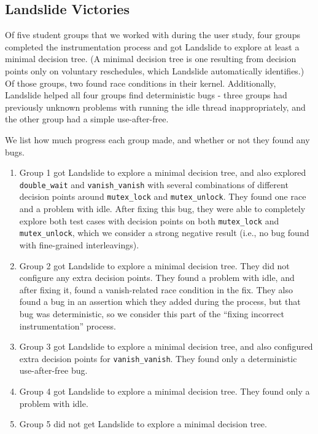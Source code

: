 \subsection{Landslide Victories}
\label{sec:eval-victory}

Of five student groups that we worked with during the user study, four groups completed the instrumentation process and got Landslide to explore at least a minimal decision tree. (A minimal decision tree is one resulting from decision points only on voluntary reschedules, which Landslide automatically identifies.) Of those groups, two found race conditions in their kernel. Additionally, Landslide helped all four groups find deterministic bugs - three groups had previously unknown problems with running the idle thread inappropriately, and the other group had a simple use-after-free.

We list how much progress each group made, and whether or not they found any bugs.

\begin{enumerate}
	\item %
		Group 1 got Landslide to explore a minimal decision tree, and also explored \texttt{double\_wait} and \texttt{vanish\_vanish} with several combinations of different decision points around \texttt{mutex\_lock} and \texttt{mutex\_unlock}. They found one race and a problem with idle.
		After fixing this bug, they were able to completely explore both test cases with decision points on both \texttt{mutex\_lock} and \texttt{mutex\_unlock}, which we consider a strong negative result (i.e., no bug found with fine-grained interleavings).
	\item %
		Group 2 got Landslide to explore a minimal decision tree. They did not configure any extra decision points. They found a problem with idle, and after fixing it, found a vanish-related race condition in the fix. They also found a bug in an assertion which they added during the process, but that bug was deterministic, so we consider this part of the ``fixing incorrect instrumentation'' process.
	\item %
		Group 3 got Landslide to explore a minimal decision tree, and also configured extra decision points for \texttt{vanish\_vanish}. They found only a deterministic use-after-free bug.
	\item %
		Group 4 got Landslide to explore a minimal decision tree. They found only a problem with idle.
	\item %
		Group 5 did not get Landslide to explore a minimal decision tree.
\end{enumerate}

